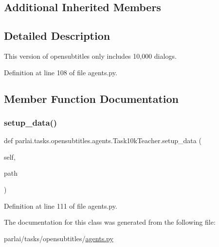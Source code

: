 \subsection*{Additional Inherited Members}


\subsection{Detailed Description}
\begin{DoxyVerb}This version of opensubtitles only includes 10,000 dialogs.\end{DoxyVerb}
 

Definition at line 108 of file agents.\+py.



\subsection{Member Function Documentation}
\mbox{\label{classparlai_1_1tasks_1_1opensubtitles_1_1agents_1_1Task10kTeacher_a2e336eeab89568e9d1bd316e401e9dc1}} 
\subsubsection{\texorpdfstring{setup\+\_\+data()}{setup\_data()}}
{\footnotesize\ttfamily def parlai.\+tasks.\+opensubtitles.\+agents.\+Task10k\+Teacher.\+setup\+\_\+data (\begin{DoxyParamCaption}\item[{}]{self,  }\item[{}]{path }\end{DoxyParamCaption})}



Definition at line 111 of file agents.\+py.



The documentation for this class was generated from the following file\+:\begin{DoxyCompactItemize}
\item 
parlai/tasks/opensubtitles/\hyperlink{parlai_2tasks_2opensubtitles_2agents_8py}{agents.\+py}\end{DoxyCompactItemize}
